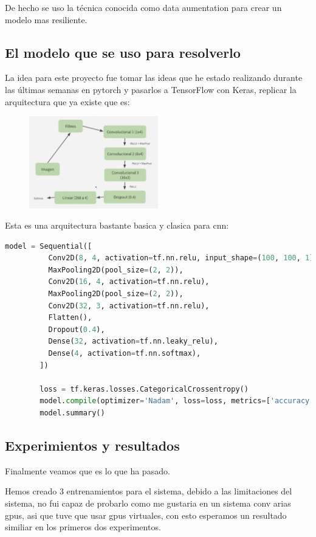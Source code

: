 \documentclass[10pt, fleqn, journal]{IEEEtran}
\theoremstyle{break}                                            %
\begin{document}
       De hecho se uso la técnica conocida como data aumentation para crear un modelo mas resiliente.

    \subsection{El modelo que se uso para resolverlo}

      La idea para este proyecto fue tomar las ideas que he estado realizando durante las 
      últimas semanas en pytorch y pasarlos a TensorFlow con Keras, 
      replicar la arquitectura que ya existe que es:
      \begin{figure}[ht!]
        \includegraphics[width=0.5\textwidth]{model}
      \end{figure}

      Esta es una arquitectura bastante basica y clasica para cnn:
      \begin{lstlisting}[language=python, gobble=7]
        model = Sequential([
          Conv2D(8, 4, activation=tf.nn.relu, input_shape=(100, 100, 1)),
          MaxPooling2D(pool_size=(2, 2)),
          Conv2D(16, 4, activation=tf.nn.relu),
          MaxPooling2D(pool_size=(2, 2)),
          Conv2D(32, 3, activation=tf.nn.relu),
          Flatten(),
          Dropout(0.4),
          Dense(32, activation=tf.nn.leaky_relu),
          Dense(4, activation=tf.nn.softmax),
        ])

        loss = tf.keras.losses.CategoricalCrossentropy()
        model.compile(optimizer='Nadam', loss=loss, metrics=['accuracy'])
        model.summary()
      \end{lstlisting}

    \subsection{Experimientos y resultados}

    Finalmente veamos que es lo que ha pasado.

    Hemos creado 3 entrenamientos para el sistema, debido a las limitaciones del sistema, no fui
    capaz de probarlo como me gustaria en un sistema conv arias gpus, asi que tuve que usar gpus
    virtuales, con esto esperamos un resultado similiar en los primeros dos experimentos.
\end{document}
